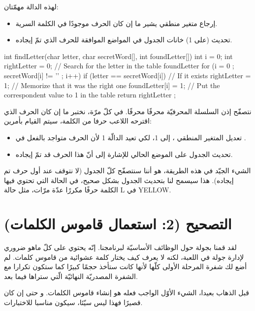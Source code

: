لهذه الدالة مهمّتان:

\begin{itemize}
  \item إرجاع متغير منطقي يشير ما إن كان الحرف موجودًا في الكلمة السرية.
  \item تحديث (على 1) خانات الجدول
في المواضع الموافقة للحرف الذي تمّ إيجاده.
\end{itemize}

\begin{Csource}
int findLetter(char letter, char secretWord[], int foundLetter[])
{
  int i = 0;
  int rightLetter = 0;
  // Search for the letter in the table foundLetter
  for (i = 0 ; secretWord[i] != '\0' ; i++)
  {
    if (letter == secretWord[i]) // If it exists
    {
      rightLetter = 1; // Memorize that it was the right one
      foundLetter[i] = 1; // Put the correspondent value to 1 in the table
    }
  }
  return rightLetter ;
}
\end{Csource}

نتصفّح إذن السلسلة المحرفيّة
محرفًا محرفًا. في كلّ مرّة، نختبر ما إن كان الحرف الذي اقترحه اللاعب حرفا من الكلمة، سيتم القيام بأمرين:
\begin{itemize}
  \item تعديل المتغير المنطقي
،
إلى  1، لكي تعيد الدالّة 1 لأن الحرف متواجد بالفعل في
.
  \item تحديث الجدول
على الموضع الحالي للإشارة إلى أنّ هذا الحرف قد تمّ إيجاده.
\end{itemize}

الشيء الجيّد في هذه الطريقة، هو أننا سنتصفّح كلّ الجدول (لا نتوقف عند أول حرف تم إيجاده). هذا سيسمح لنا بتحديث الجدول
بشكل صحيح، في الحالة التي تحتوي فيها الكلمة حرفًا مكررًا عدّة مرّات، مثل حالة
\textenglish{L}
في
\textenglish{YELLOW}.

\section{التصحيح (2: استعمال قاموس الكلمات)}
لقد قمنا بجولة حول الوظائف الأساسيّة لبرنامجنا. إنّه يحتوي على كلّ ماهو ضروري لإدارة جولة في اللعبة، لكنه لا يعرف كيف يختار كلمة عشوائية من قاموس كلمات. لم أضع لك شفرة المرحلة الأولى كلّها لأنها كانت ستأخذ حجمًا كبيرًا كما ستكون تكرارا مع الشفرة المصدريّة النهائيّة الّتي ستراها فيما بعد.

قبل الذهاب بعيدا، الشيء الأوّل الواجب فعله هو إنشاء قاموس الكلمات. و حتى إن كان قصيرًا فهذا ليس سيّئا، سيكون مناسبا للاختبارات.

